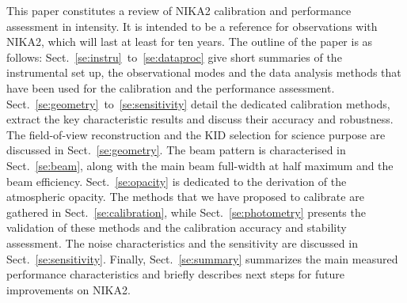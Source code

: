This paper constitutes a review of NIKA2 calibration and
performance assessment in intensity. It is intended to be a reference
for observations with NIKA2, which will last at least for ten years. 
The outline of the paper is as follows:
Sect.~\ref{se:instru}~to~\ref{se:dataproc} give short summaries of the
instrumental set up, the observational modes and the data analysis methods
that have been used for the calibration and the performance
assessment. Sect.~\ref{se:geometry}~to~\ref{se:sensitivity} detail the
dedicated calibration methods, extract the key characteristic results
and discuss their accuracy and robustness. The field-of-view
reconstruction and the KID selection for science purpose are discussed
in Sect.~\ref{se:geometry}. The beam pattern is characterised in
Sect.~\ref{se:beam}, along with the main beam
full-width at half maximum and the beam
efficiency. Sect.~\ref{se:opacity} is dedicated to the derivation of
the atmospheric opacity. The methods that we have proposed to
calibrate are gathered in Sect.~\ref{se:calibration}, while
Sect.~\ref{se:photometry} presents the validation of these methods and
the calibration accuracy and stability assessment. The noise
characteristics and the sensitivity are discussed in
Sect.~\ref{se:sensitivity}. Finally, Sect.~\ref{se:summary} summarizes
the main measured performance characteristics and {\lp briefly
describes next steps for future improvements on NIKA2.}















